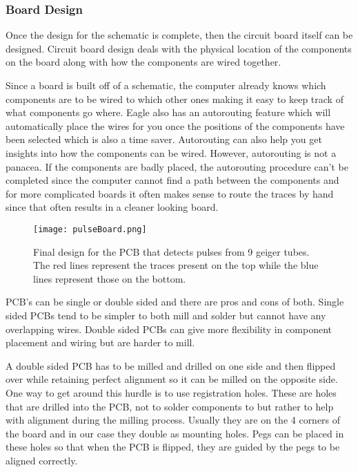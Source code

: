 \documentclass[oneside]{article}
\begin{document}
        \subsubsection{Board Design}

          Once the design for the schematic is complete, then the circuit board itself can be designed. Circuit board design deals with the physical location of the components on the board along with how the components are wired together.

          Since a board is built off of a schematic, the computer already knows which components are to be wired to which other ones making it easy to keep track of what components go where. Eagle also has an autorouting feature which will automatically place the wires for you once the positions of the components have been selected which is also a time saver. Autorouting can also help you get insights into how the components can be wired. However, autorouting is not a panacea. If the components are badly placed, the autorouting procedure can't be completed since the computer cannot find a path between the components and for more complicated boards it often makes sense to route the traces by hand since that often results in a cleaner looking board.

          \begin{figure}[H]
              \centering
              \texttt{[image: pulseBoard.png]}
              \caption{Final design for the PCB that detects pulses from 9 geiger tubes. The red lines represent the traces present on the top while the blue lines represent those on the bottom.}
              \label{pulseBoard}
          \end{figure}

          PCB's can be single or double sided and there are pros and cons of both. Single sided PCBs tend to be simpler to both mill and solder but cannot have any overlapping wires. Double sided PCBs can give more flexibility in component placement and wiring but are harder to mill.

          A double sided PCB has to be milled and drilled on one side and then flipped over while retaining perfect alignment so it can be milled on the opposite side. One way to get around this hurdle is to use registration holes. These are holes that are drilled into the PCB, not to solder components to but rather to help with alignment during the milling process. Usually they are on the 4 corners of the board and in our case they double as mounting holes. Pegs can be placed in these holes so that when the PCB is flipped, they are guided by the pegs to be aligned correctly.
\end{document}
